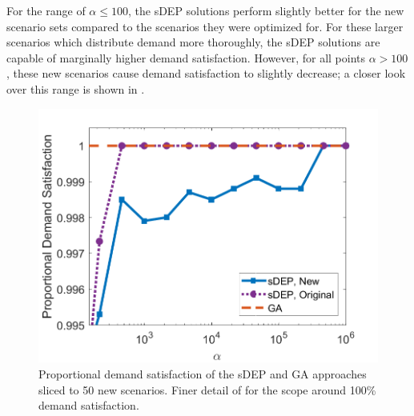 \documentclass[12pt,dvipsnames]{report}
\begin{document}
For the range of $\alpha \leq 100$, the sDEP solutions perform slightly better for the new scenario sets compared to the scenarios they were optimized for.  For these larger scenarios which distribute demand more thoroughly, the sDEP solutions are capable of marginally higher demand satisfaction.  However, for all points $\alpha > 100$, these new scenarios cause demand satisfaction to slightly decrease; a closer look over this range is shown in .

\begin{figure}[htp]
	\centering
	\includegraphics[height=0.4\textheight]{Figures/Prelim_EvalO25_ComparisonSatisfactionZoomed}
	\caption[Demand satisfaction of the preliminary simulations evaluated against 50 new scenarios in finer detail]{Proportional demand satisfaction of the sDEP and GA approaches sliced to 50 new scenarios. Finer detail of  for the scope around 100\% demand satisfaction.}
	\label{fig:Prelim_VWNCompSatisEvalClose}
\end{figure}
\end{document}
